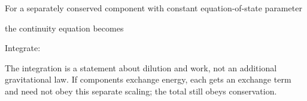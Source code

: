 \documentclass[
  11pt,
  letterpaper,
  oneside,
  openany]{scrbook}
\begin{document}
For a separately conserved component with constant equation-of-state
parameter

\begin{center}
\begingroup
{}
\ifdim\wd\grmathbox>\linewidth
\resizebox{\linewidth}{!}{\usebox{\grmathbox}}
\else\usebox{\grmathbox}\fi
\endgroup
\end{center}

the continuity equation becomes

\begin{center}
\begingroup
{}
\ifdim\wd\grmathbox>\linewidth
\resizebox{\linewidth}{!}{\usebox{\grmathbox}}
\else\usebox{\grmathbox}\fi
\endgroup
\end{center}

Integrate:

\begin{center}
\begingroup
{}
\ifdim\wd\grmathbox>\linewidth
\resizebox{\linewidth}{!}{\usebox{\grmathbox}}
\else\usebox{\grmathbox}\fi
\endgroup
\end{center}

The integration is a statement about dilution and work, not an
additional gravitational law. If components exchange energy, each gets
an exchange term and need not obey this separate scaling; the total
still obeys conservation.

\begingroup\small\setlength{\tabcolsep}{5pt}\renewcommand{\arraystretch}{1.13}
\end{document}
